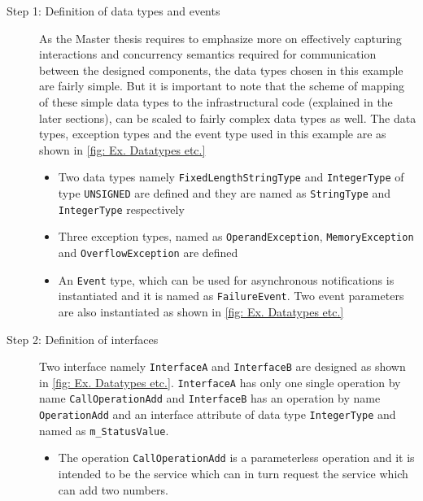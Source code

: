 \begin{description}
\item [Step 1: Definition of data types and events] As the Master thesis requires to emphasize more on effectively capturing interactions and concurrency semantics required for communication between the designed components, the data types chosen in this example are fairly simple. But it is important to note that the scheme of mapping of these simple data types to the infrastructural code (explained in the later sections), can be scaled to fairly complex data types as well. The data types, exception types and the event type used in this example are as shown in \cref{fig: Ex. Datatypes etc.}  

\begin{itemize}
\item Two data types namely \texttt{Fixed\allowbreak Length\allowbreak String\allowbreak Type} and \texttt{Integer\allowbreak Type} of type \texttt{UNSIGNED} are defined and they are named as \texttt{StringType} and \texttt{IntegerType} respectively

\item Three exception types, named as \texttt{OperandException}, \texttt{MemoryException} and \texttt{Overflow\allowbreak Exception} are defined 

\item An \texttt{Event} type, which can be used for asynchronous notifications \cite{SpecMetamodel} is instantiated and it is named as \texttt{FailureEvent}. Two event parameters are also instantiated as shown in \cref{fig: Ex. Datatypes etc.}

\end{itemize} 

\item [Step 2: Definition of interfaces] Two interface namely \texttt{InterfaceA} and \texttt{InterfaceB} are designed as shown in \cref{fig: Ex. Datatypes etc.}. \texttt{InterfaceA} has only one single operation by name \texttt{CallOperationAdd} and \texttt{InterfaceB} has an operation by name \texttt{OperationAdd} and an interface attribute of data type \texttt{IntegerType} and named as \texttt{m\_StatusValue}.  

\begin{itemize}
\item The operation \texttt{Call\allowbreak OperationAdd} is a parameterless operation and it is intended to be the service which can in turn request the service which can add two numbers.


\end{itemize}
\end{description}
